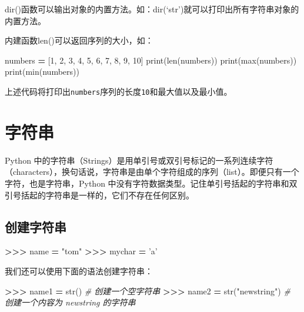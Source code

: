 \documentclass[]{ctexbook}
\newenvironment{Shaded}{\begin{snugshade}}{\end{snugshade}}
\newcommand{\BuiltInTok}[1]{#1}
\newcommand{\CommentTok}[1]{\textcolor[rgb]{0.56,0.35,0.01}{\textit{#1}}}
\newcommand{\DecValTok}[1]{\textcolor[rgb]{0.00,0.00,0.81}{#1}}
\newcommand{\NormalTok}[1]{#1}
\newcommand{\OperatorTok}[1]{\textcolor[rgb]{0.81,0.36,0.00}{\textbf{#1}}}
\newcommand{\StringTok}[1]{\textcolor[rgb]{0.31,0.60,0.02}{#1}}
\begin{document}
dir()函数可以输出对象的内置方法。如：dir(`str')就可以打印出所有字符串对象的内置方法。

内建函数len()可以返回序列的大小，如：

\begin{Shaded}
\begin{Highlighting}[]
\NormalTok{numbers }\OperatorTok{=}\NormalTok{ [}\DecValTok{1}\NormalTok{, }\DecValTok{2}\NormalTok{, }\DecValTok{3}\NormalTok{, }\DecValTok{4}\NormalTok{, }\DecValTok{5}\NormalTok{, }\DecValTok{6}\NormalTok{, }\DecValTok{7}\NormalTok{, }\DecValTok{8}\NormalTok{, }\DecValTok{9}\NormalTok{, }\DecValTok{10}\NormalTok{]}
\BuiltInTok{print}\NormalTok{(}\BuiltInTok{len}\NormalTok{(numbers))}
\BuiltInTok{print}\NormalTok{(}\BuiltInTok{max}\NormalTok{(numbers))}
\BuiltInTok{print}\NormalTok{(}\BuiltInTok{min}\NormalTok{(numbers))}
\end{Highlighting}
\end{Shaded}

上述代码将打印出\texttt{numbers}序列的长度\texttt{10}和最大值以及最小值。

\hypertarget{ux5b57ux7b26ux4e32}{%
\section{字符串}\label{ux5b57ux7b26ux4e32}}

Python 中的字符串（Strings）是用单引号或双引号标记的一系列连续字符（characters），换句话说，字符串是由单个字符组成的序列（list）。即便只有一个字符，也是字符串，Python 中没有字符数据类型。记住单引号括起的字符串和双引号括起的字符串是一样的，它们不存在任何区别。

\hypertarget{ux521bux5efaux5b57ux7b26ux4e32}{%
\subsection{创建字符串}\label{ux521bux5efaux5b57ux7b26ux4e32}}

\begin{Shaded}
\begin{Highlighting}[]
\OperatorTok{>>>}\NormalTok{ name }\OperatorTok{=} \StringTok{"tom"}
\OperatorTok{>>>}\NormalTok{ mychar }\OperatorTok{=} \StringTok{'a'}
\end{Highlighting}
\end{Shaded}

我们还可以使用下面的语法创建字符串：

\begin{Shaded}
\begin{Highlighting}[]
\OperatorTok{>>>}\NormalTok{ name1 }\OperatorTok{=} \BuiltInTok{str}\NormalTok{() }\CommentTok{# 创建一个空字符串}
\OperatorTok{>>>}\NormalTok{ name2 }\OperatorTok{=} \BuiltInTok{str}\NormalTok{(}\StringTok{"newstring"}\NormalTok{) }\CommentTok{# 创建一个内容为 newstring 的字符串}
\end{Highlighting}
\end{Shaded}
\end{document}

